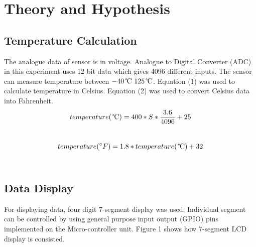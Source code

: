 \documentclass{article}
\begin{document}

\section{Theory and Hypothesis}
\subsection{Temperature Calculation}
The analogue data of sensor is in voltage. Analogue to Digital Converter (ADC) in this experiment uses 12 bit data which gives 4096 different inputs. The sensor can measure temperature between \(-40\, \celsius ~ 125\, \celsius \). Equation (1) was used to calculate temperature in Celsius. Equation (2) was used to convert Celsius data into Fahrenheit.\\
\begin{equation}
temperature(\, \celsius) = 400*S*\frac{3.6}{4096} + 25
\end{equation}\\
\begin{equation}
temperature(^{\circ}F) = 1.8*temperature(\, \celsius) + 32
\end{equation}\\
\subsection{Data Display}
For displaying data, four digit 7-segment display was used. Individual segment can be controlled by using general purpose input output (GPIO) pins implemented on the Micro-controller unit. Figure 1 shows how 7-segment LCD display is consisted.
\end{document}
